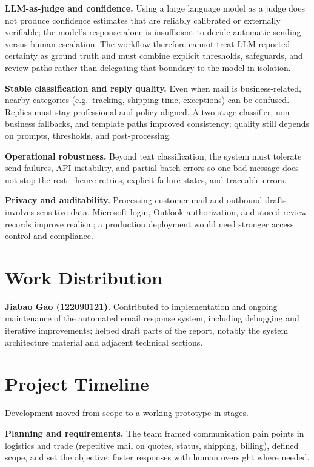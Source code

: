 \documentclass[12pt]{article}
\begin{document}
\textbf{LLM-as-judge and confidence.} Using a large language model as a judge does not produce confidence estimates that are reliably calibrated or externally verifiable; the model's response alone is insufficient to decide automatic sending versus human escalation. The workflow therefore cannot treat LLM-reported certainty as ground truth and must combine explicit thresholds, safeguards, and review paths rather than delegating that boundary to the model in isolation.

\textbf{Stable classification and reply quality.} Even when mail is business-related, nearby categories (e.g.\ tracking, shipping time, exceptions) can be confused. Replies must stay professional and policy-aligned. A two-stage classifier, non-business fallbacks, and template paths improved consistency; quality still depends on prompts, thresholds, and post-processing.

\textbf{Operational robustness.} Beyond text classification, the system must tolerate send failures, API instability, and partial batch errors so one bad message does not stop the rest---hence retries, explicit failure states, and traceable errors.

\textbf{Privacy and auditability.} Processing customer mail and outbound drafts involves sensitive data. Microsoft login, Outlook authorization, and stored review records improve realism; a production deployment would need stronger access control and compliance.

\section{Work Distribution}

\textbf{Jiabao Gao (122090121).} Contributed to implementation and ongoing maintenance of the automated email response system, including debugging and iterative improvements; helped draft parts of the report, notably the system architecture material and adjacent technical sections.

\section{Project Timeline}

Development moved from scope to a working prototype in stages.

\textbf{Planning and requirements.} The team framed communication pain points in logistics and trade (repetitive mail on quotes, status, shipping, billing), defined scope, and set the objective: faster responses with human oversight where needed.
\end{document}
